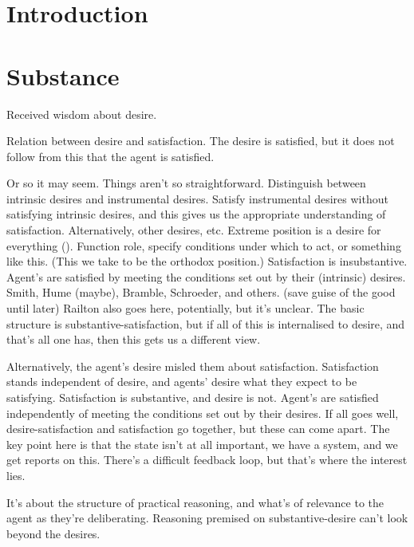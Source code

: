 \documentclass[10pt]{article}
\begin{document}
\section{Introduction}
\label{sec:introduction}



\section{Substance}
\label{sec:substance}

Received wisdom about desire.

Relation between desire and satisfaction.
The desire is satisfied, but it does not follow from this that the agent is satisfied.

Or so it may seem.
Things aren't so straightforward.
Distinguish between intrinsic desires and instrumental desires.
Satisfy instrumental desires without satisfying intrinsic desires, and this gives us the appropriate understanding of satisfaction.
Alternatively, other desires, etc.
Extreme position is a desire for everything (\cite{Schroeder:2007aa}).
Function role, specify conditions under which to act, or something like this.
(This we take to be the orthodox position.)
Satisfaction is insubstantive.
Agent's are satisfied by meeting the conditions set out by their (intrinsic) desires.
Smith, Hume (maybe), Bramble, Schroeder, and others.
{\color{red}
  (save guise of the good until later)
}
Railton also goes here, potentially, but it's unclear.
The basic structure is substantive-satisfaction, but if all of this is internalised to desire, and that's all one has, then this gets us a different view.

Alternatively, the agent's desire misled them about satisfaction.
Satisfaction stands independent of desire, and agents' desire what they expect to be satisfying.
Satisfaction is substantive, and desire is not.
Agent's are satisfied independently of meeting the conditions set out by their desires.
If all goes well, desire-satisfaction and satisfaction go together, but these can come apart.
The key point here is that the state isn't at all important, we have a system, and we get reports on this.
There's a difficult feedback loop, but that's where the interest lies.


It's about the structure of practical reasoning, and what's of relevance to the agent as they're deliberating.
Reasoning premised on substantive-desire can't look beyond the desires.
\end{document}
